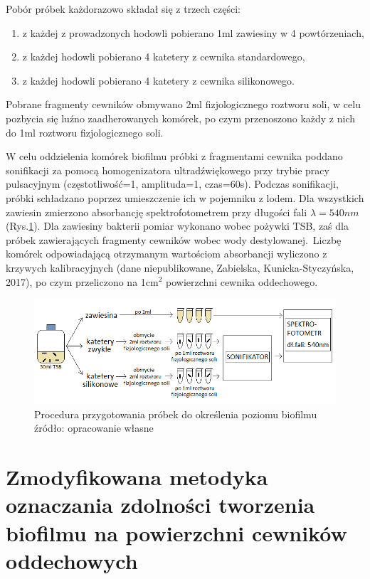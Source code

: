 \documentclass[11pt,a4paper]{report}
\begin{document}
Pobór próbek każdorazowo składał się z trzech części:
\begin{enumerate}
\item z każdej z prowadzonych hodowli pobierano 1ml zawiesiny w 4 powtórzeniach,
\item z każdej hodowli pobierano 4 katetery z cewnika standardowego, 
\item z każdej hodowli pobierano 4 katetery z cewnika silikonowego.
\end{enumerate}
Pobrane fragmenty cewników obmywano 2ml fizjologicznego roztworu soli, w celu pozbycia się luźno zaadherowanych komórek, po czym przenoszono każdy z nich do 1ml roztworu fizjologicznego soli.

W celu oddzielenia komórek biofilmu próbki z fragmentami cewnika poddano sonifikacji za pomocą homogenizatora ultradźwiękowego przy trybie pracy pulsacyjnym (częstotliwość=1, amplituda=1, czas=60s). Podczas sonifikacji, próbki schładzano poprzez umieszczenie ich w pojemniku z lodem.
Dla wszystkich zawiesin zmierzono absorbancję spektrofotometrem przy długości fali $\lambda = 540nm$(Rys.\ref{pomiar_stare}). Dla zawiesiny bakterii pomiar wykonano wobec pożywki TSB, zaś dla próbek zawierających fragmenty cewników wobec wody destylowanej.\
Liczbę komórek odpowiadającą otrzymanym wartościom absorbancji wyliczono z krzywych kalibracyjnych (dane niepublikowane, Zabielska, Kunicka-Styczyńska, 2017), po czym przeliczono na 1cm$^2$ powierzchni cewnika oddechowego.
\begin{figure}[!h]
\begin{center}
\includegraphics[scale=0.65]{img/pomiar_stare.png}
\caption{Procedura przygotowania próbek do określenia poziomu biofilmu\\
źródło: opracowanie własne}\label{pomiar_stare}
\end{center} 
\end{figure}

\clearpage
\section{Zmodyfikowana metodyka oznaczania zdolności tworzenia biofilmu na powierzchni cewników oddechowych}
\end{document}
